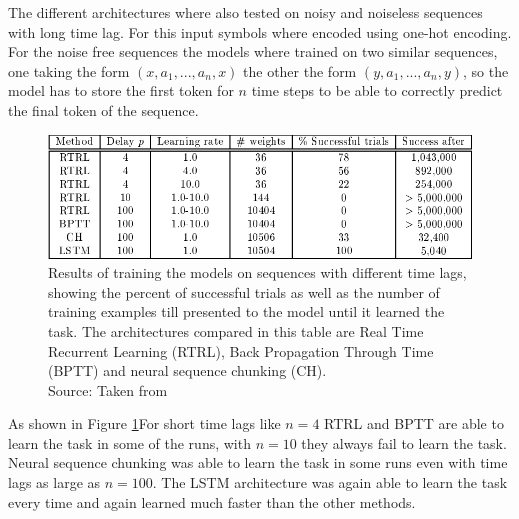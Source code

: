 \documentclass[twoside,a4paper,10pt,DIV=12,BCOR=12mm]{scrartcl}
\begin{document}
The different architectures where also tested on noisy and noiseless sequences with long time lag.
For this input symbols where encoded using one-hot encoding.\cite{hochreiter1997lstm, qiu2022onehot}
\\ For the noise free sequences the models where trained on two similar sequences, one taking the form $(x, a_1, ..., a_n, x)$ the other the form $(y,a_1,...,a_n,y)$, so the model has to store the first token for $n$ time steps to be able to correctly predict the final token of the sequence.\cite{hochreiter1997lstm}\\
\begin{figure}[h!]
    \centering
    \includegraphics[width=0.75\linewidth]{restask2.png}
    \caption{Results of training the models on sequences with different time lags, showing the percent of successful trials as well as the number of training examples till presented to the model until it learned the task. The architectures compared in this table are Real Time Recurrent Learning (RTRL), Back Propagation Through Time (BPTT) and neural sequence chunking (CH). \\Source: Taken from \cite{hochreiter1997lstm}}
    \label{fig:exp2res}
\end{figure}
As shown in Figure \ref{fig:exp2res}For short time lags like $n=4$ RTRL and BPTT are able to learn the task in some of the runs, with $n=10$ they always fail to learn the task. Neural sequence chunking was able to learn the task in some runs even with time lags as large as $n=100$. The LSTM architecture was again able to learn the task every time and again learned much faster than the other methods.\cite{hochreiter1997lstm}\\
\end{document}
